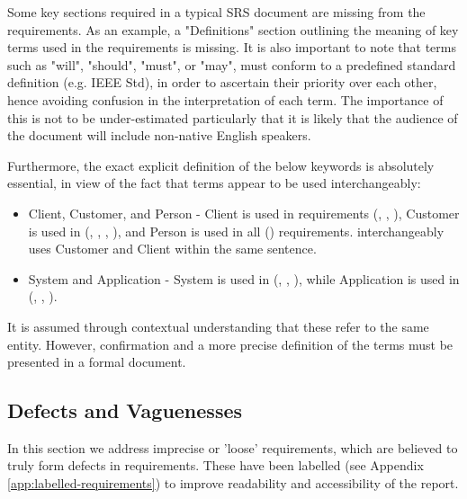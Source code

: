 Some key sections required in a typical SRS document are missing from the requirements.  As an example, a "Definitions" section outlining the meaning of key terms used in the requirements is missing.  It is also important to note that terms such as "will", "should", "must", or "may", must conform to a predefined standard definition (e.g. IEEE Std), in order to ascertain their priority over each other, hence avoiding confusion in the interpretation of each term. The importance of this is not to be under-estimated particularly that it is likely that the audience of the document will include non-native English speakers.
\par
Furthermore, the exact explicit definition of the below keywords is absolutely essential, in view of the fact that terms appear to be used interchangeably:
\begin{itemize}
    \item Client, Customer, and Person - Client is used in requirements (\ROne, \RTwo, \RFive), Customer is used in (\RTwo, \RThree, \RFour, \RFive), and Person is used in all (\REight) requirements. \RFive \space interchangeably uses Customer and Client within the same sentence. 
    \item System and Application - System is used in (\RTwo, \RSix, \RSeven), while Application is used in (\ROne, \RFour, \RFive). 
\end{itemize}
It is assumed through contextual understanding that these refer to the same entity.  However, confirmation and a more precise definition of the terms must be presented in a formal document.
\par


\subsection{Defects and Vaguenesses}
\label{sec:defects-and-vaguenesses}
In this section we address imprecise or 'loose' requirements, which are believed to truly form defects in requirements.
These have been labelled (see Appendix \ref{app:labelled-requirements}) to improve readability and accessibility of the report.

